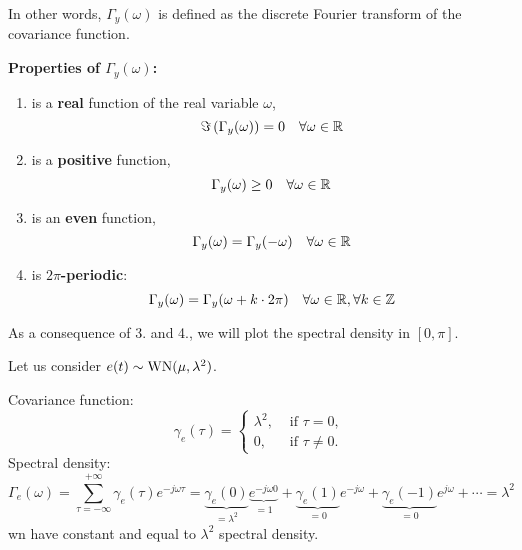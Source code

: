 In other words, $\Gamma_y(\omega)$ is defined as the discrete Fourier transform of the covariance function.

\textbf{Properties of $\Gamma_{y}(\omega)$:}
\begin{enumerate}
	\item is a \textbf{real} function of the real variable $\omega$,
	$$
		\Im\left(\Gamma_{y}(\omega)\right)=0 \quad \forall \omega \in \mathbb{R}
	$$
	\item is a \textbf{positive} function,
	$$
		\Gamma_{y}(\omega) \geq 0 \quad \forall \omega \in \mathbb{R}
	$$
	\item is an \textbf{even} function,
	$$
		\Gamma_{y}(\omega)=\Gamma_{y}(-\omega) \quad \forall \omega \in \mathbb{R}
	$$
	\item is \textbf{$2\pi$-periodic}:
	$$
		\Gamma_{y}(\omega)=\Gamma_{y}(\omega+k \cdot 2 \pi) \quad \forall \omega \in \mathbb{R}, \forall k \in \mathbb{Z}
	$$
\end{enumerate}

\begin{obs}
As a consequence of 3. and 4., we will plot the spectral density in $[0, \pi]$.
\end{obs}

\begin{example}
	Let us consider $e(t) \sim \operatorname{WN}(\mu, \lambda^{2})$.

	Covariance function:
	\[
		\gamma_{e}(\tau) =
		\begin{cases}
			\lambda^{2}, & \text { if } \tau=0, \\
			0, & \text { if } \tau \neq 0.
		\end{cases}
	\]
	Spectral density:
	\[
		\Gamma_{e}(\omega) =\sum_{\tau=-\infty}^{+\infty} \gamma_{e}(\tau) e^{-j \omega \tau}=\underbrace{\gamma_{e}(0)}_{=\lambda^2} \underbrace{e^{-j \omega 0}}_{=1}+\underbrace{\gamma_{e}(1)}_{=0} e^{-j \omega} + \underbrace{\gamma_{e}(-1)}_{=0} e^{j \omega}+\cdots = \lambda^{2}
	\]
	\gls{wn} have constant and equal to $\lambda^{2}$ spectral density.
\end{example}

